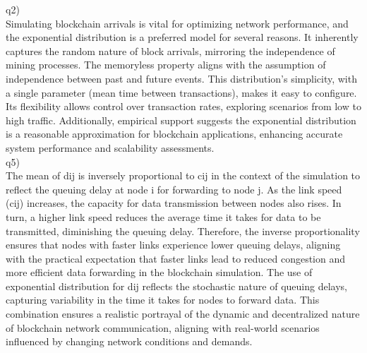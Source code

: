 \documentclass[10pt]{report}
\begin{document}
q2)\\	
Simulating blockchain arrivals is vital for optimizing network performance, and the exponential distribution is a preferred model for several reasons. It inherently captures the random nature of block arrivals, mirroring the independence of mining processes. The memoryless property aligns with the assumption of independence between past and future events. This distribution's simplicity, with a single parameter (mean time between transactions), makes it easy to configure. Its flexibility allows control over transaction rates, exploring scenarios from low to high traffic. Additionally, empirical support suggests the exponential distribution is a reasonable approximation for blockchain applications, enhancing accurate system performance and scalability assessments.	
\\
q5)\\

The mean of dij is inversely proportional to cij in the context of the simulation to reflect the queuing delay at node i for forwarding to node j. As the link speed (cij) increases, the capacity for data transmission between nodes also rises. In turn, a higher link speed reduces the average time it takes for data to be transmitted, diminishing the queuing delay. Therefore, the inverse proportionality ensures that nodes with faster links experience lower queuing delays, aligning with the practical expectation that faster links lead to reduced congestion and more efficient data forwarding in the blockchain simulation. The use of exponential distribution for dij reflects the stochastic nature of queuing delays, capturing variability in the time it takes for nodes to forward data. This combination ensures a realistic portrayal of the dynamic and decentralized nature of blockchain network communication, aligning with real-world scenarios influenced by changing network conditions and demands.
\end{document}
